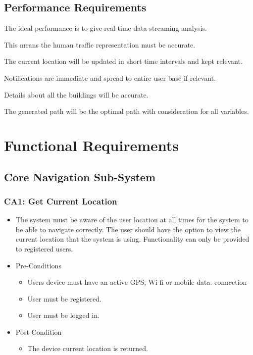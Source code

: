 \documentclass[12pt,a4paper]{article}
\begin{document}
\begin{RequirementsEnum}
	\subsection{Performance Requirements}
\item The ideal performance is to give real-time data streaming analysis. 
	\begin{RequirementsEnum}	
    	\item This means the human traffic representation must be accurate.
	    \item The current location will be updated in short time intervals and kept relevant.
	    \item Notifications are immediate and spread to entire user base if relevant.
	\end{RequirementsEnum}    
\item Details about all the buildings will be accurate.
\item The generated path will be the optimal path with consideration for all variables.
	\end{RequirementsEnum}
\section{Functional Requirements}
	\subsection{Core Navigation Sub-System}
		\subsubsection{CA1: Get Current Location}
			\begin{itemize}
				\item The system must be aware of the user location at all times for the system to be able to navigate correctly. The user should have the option to view the current location that the system is using. Functionality can only be provided to registered users.
				\item Pre-Conditions
					\begin{itemize}
						\item Users device must have an active GPS, Wi-fi or mobile data. connection
						\item User must be registered.
						\item User must be logged in.
					\end{itemize}
				\item Post-Condition
					\begin{itemize}
						\item The device current location is returned.
					\end{itemize}
			\end{itemize}
\end{document}
